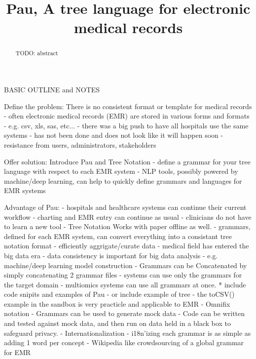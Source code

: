 \documentclass[journal]{IEEEtran}
\begin{document}
\title{Pau, A tree language for electronic medical records}

\iffalse
\author{
  Lambert Leong \\
  University of Hawaii \\
  {\underline{lambert3@hawaii.edu}} \\
\and
  Breck Yunits\\
  University of Hawaii Cancer Center\\
  {\underline{breckuh@gmail.com}}\\ }
\fi


\date{}

\maketitle
\begin{abstract}
	TODO: abstract
\end{abstract}

\iffalse
BASIC OUTLINE and NOTES

Define the problem: There is no consistent format or template for medical records
	- often electronic medical records (EMR) are stored in various forms and
	  formats
		- e.g. csv, xls, sas, etc...
	- there was a big push to have all hospitals use the same systems
		- has not been done and does not look like it will happen soon
		- resistance from users, administrators, stakeholders

Offer solution: Introduce Pau and Tree Notation
	- define a grammar for your tree language with respect to each EMR system
	- NLP tools, possibly powered by machine/deep learning, can help to
	  quickly define grammars and languages for EMR systems

Advantage of Pau:
	- hospitals and healthcare systems can continue their current workflow
		- charting and EMR entry can continue as usual 
		- clinicians do not have to learn a new tool
    - Tree Notation Works with paper offline as well.
	- grammars, defined for each EMR system, can convert everything into a
	  consistant tree notation format
		- efficiently aggrigate/curate data 
		- medical field has entered the big data era
			- data consistency is important for big data analysis
				- e.g. machine/deep learning model construction
    - Grammars can be Concatenated by simply concatenating 2 grammar files
     - systems can use only the grammars for the target domain
     - multiomics systems can use all grammars at once.
	* include code snipits and examples of Pau
		- or include example of tree
			- the toCSV() example in the sandbox is very practicle
			  and applicable to EMR
  - Omnifix notation
  - Grammars can be used to generate mock data
   - Code can be written and tested against mock data, and then run on data held in a black box to safeguard privacy.
  - Internationalization
   - i18n'izing each grammar is as simple as adding 1 word per concept
  - Wikipedia like crowdsourcing of a global grammar for EMR
\end{document}
